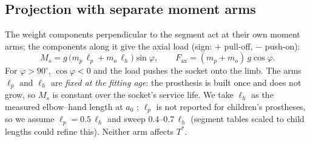 \documentclass[11pt]{article}
\newcommand{\Fax}{F_{\mathrm{ax}}}
\theoremstyle{definition}
\begin{document}
\begin{center}
\end{center}

\subsection{Projection with separate moment arms}
The weight components perpendicular to the segment act at their own moment arms; the components along it give the axial load (sign: $+$ pull-off, $-$ push-on):
\begin{equation}
M_s=g\,\big(m_p\,\ell_p+m_o\,\ell_h\big)\sin\varphi,
\qquad
\Fax=(m_p+m_o)\,g\cos\varphi .
\label{eq:lift}
\end{equation}
For $\varphi>90^\circ$, $\cos\varphi<0$ and the load pushes the socket onto the limb. The arms $\ell_p$ and $\ell_h$ are \emph{fixed at the fitting age}: the prosthesis is built once and does not grow, so $M_s$ is constant over the socket's service life. We take $\ell_h$ as the measured elbow--hand length at $a_0$ \cite{snyder1977}; $\ell_p$ is not reported for children's prostheses, so we assume $\ell_p=0.5\,\ell_h$ and sweep $0.4$--$0.7\,\ell_h$ (segment tables scaled to child lengths \cite{otmani2023} could refine this). Neither arm affects $T^*$.
\end{document}
